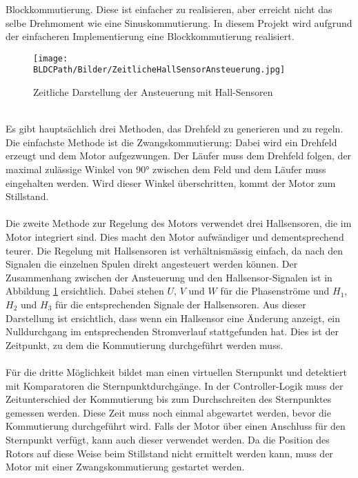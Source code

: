         Blockkommutierung. Diese ist einfacher zu realisieren, aber erreicht 
        nicht das selbe Drehmoment wie eine Sinuskommutierung. In diesem 
        Projekt wird aufgrund der einfacheren Implementierung eine 
        Blockkommutierung realisiert. \\
    \ifSTANDALONE
        \begin{figure}[h!]
            \texttt{[image: \\BLDCPath/Bilder/ZeitlicheHallSensorAnsteuerung.jpg]}
            \centering
            \caption[Zeitliche Darstellung der Ansteuerung mit Hall-Sensoren]
            {Zeitliche Darstellung der Ansteuerung mit Hall-Sensoren \cite{AppNote:BrushlessuC}}
            \label{abb:ZeitlicheAnsteuerungBrushlessMotor}
        \end{figure}
    \fi
        \\
        Es gibt hauptsächlich drei Methoden, das Drehfeld zu generieren und zu 
        regeln. Die einfachste Methode ist die Zwangskommutierung: 
        Dabei wird ein Drehfeld erzeugt und dem Motor aufgezwungen. Der Läufer 
        muss dem Drehfeld folgen, der maximal zulässige Winkel von 90\si{\degree}
        zwischen dem Feld und dem Läufer muss eingehalten werden. Wird dieser 
        Winkel überschritten, kommt der Motor zum Stillstand.\\
        \\
        Die zweite Methode zur Regelung des Motors verwendet drei Hallsensoren, die im 
        Motor integriert sind. Dies macht den Motor aufwändiger und 
        dementsprechend teurer. Die Regelung mit Hallsensoren ist 
        verhältnismässig einfach, da nach den Signalen die einzelnen Spulen 
        direkt angesteuert werden können. Der Zusammenhang zwischen der 
        Ansteuerung und den Hallsensor-Signalen ist in Abbildung 
        \ref{abb:ZeitlicheAnsteuerungBrushlessMotor} ersichtlich. Dabei stehen 
        $U$, $V$ und $W$ für die Phasenströme und $H_1$, $H_2$ und $H_3$ für die 
        entsprechenden Signale der Hallsensoren. Aus dieser Darstellung ist 
        ersichtlich, dass wenn ein Hallsensor eine Änderung anzeigt, 
        ein Nulldurchgang im entsprechenden Stromverlauf stattgefunden hat. 
        Dies ist der Zeitpunkt, zu dem die Kommutierung durchgeführt werden 
        muss.\\
        \\
        Für die dritte Möglichkeit bildet man einen virtuellen Sternpunkt 
        und detektiert mit Komparatoren die Sternpunktdurchgänge. 
        In der Controller-Logik muss der Zeitunterschied der Kommutierung 
        bis zum Durchschreiten des Sternpunktes gemessen werden. Diese Zeit 
        muss noch einmal abgewartet werden, bevor die Kommutierung durchgeführt 
        wird. Falls der Motor über einen Anschluss für den Sternpunkt 
        verfügt, kann auch dieser verwendet werden. Da die Position des Rotors 
        auf diese Weise beim Stillstand nicht ermittelt werden kann, muss der 
        Motor mit einer Zwangskommutierung gestartet werden. 
\ifSTANDALONE
